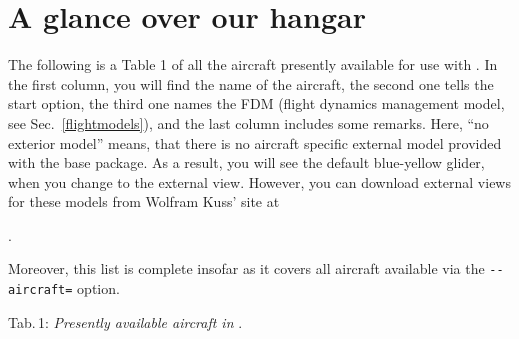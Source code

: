 \section{A glance over our hangar}\label{hangar}
The following is a Table 1 of all the aircraft presently available for use with \FlightGear{}. In the first column, you will find the name of the aircraft, the second one tells the start option, the third one names the FDM (flight dynamics management model, see Sec.~\ref{flightmodels}), and the last column includes some remarks. Here, ``no exterior model'' means, that there is no aircraft specific external model provided with the base package. As a result, you will see the default blue-yellow glider, when you change to the external view. However, you can download external views for these models from Wolfram Kuss' site at

.

Moreover, this list is complete insofar as it covers all aircraft available via the \texttt{-$ $-aircraft=} option. 
\eject

\noindent
 Tab.\,1: \textit{Presently available aircraft in \FlightGear{}}.
 \medskip
 
\noindent
{\scriptsize

}


